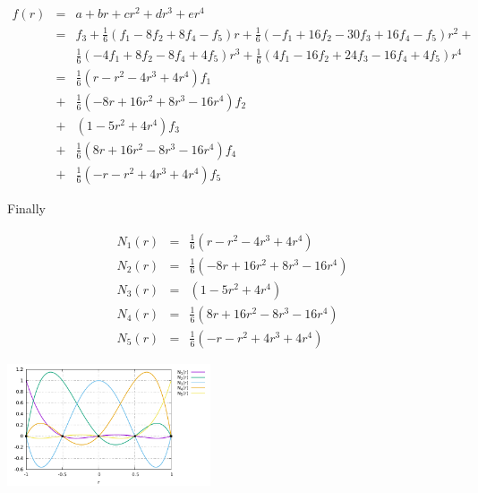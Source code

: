 \begin{eqnarray}
f(r) 
&=& a+br+cr^2+dr^3+er^4 \\
&=& f_3 + 
\frac{1}{6} \left( f_1 -8f_2 +8 f_4 -f_5     \right)  r  +
\frac{1}{6} \left( -f_1 +16f_2 -30f_3    + 16f_4- f_5   \right) r^2 +\\ &&
\frac{1}{6} \left( -4f_1 +8f_2     -8f_4+ 4 f_5   \right) r^3 +
\frac{1}{6} \left( 4f_1 -16f_2 +24f_3 -16f_4+ 4 f_5   \right) r^4 \\
&=& \frac{1}{6} \left(  r- r^2 -4r^3 +4r^4\right) f_1 \\
&+& \frac{1}{6} \left(  -8r+16 r^2 +8r^3 -16 r^4\right) f_2 \\
&+& \left( 1 -5r^2+4r^4  \right) f_3 \\
&+& \frac{1}{6} \left(  8r+16 r^2 -8r^3 -16 r^4\right) f_4 \\
&+& \frac{1}{6} \left(  -r- r^2 +4r^3 +4r^4\right) f_5
\end{eqnarray}

Finally
\begin{mdframed}[backgroundcolor=blue!5]
\begin{eqnarray}
N_1(r)&=& \frac{1}{6} \left(  r- r^2 -4r^3 +4r^4\right) \\
N_2(r)&=& \frac{1}{6} \left(  -8r+16 r^2 +8r^3 -16 r^4\right)  \\
N_3(r)&=& \left( 1 -5r^2+4r^4  \right)  \\
N_4(r)&=& \frac{1}{6} \left(  8r+16 r^2 -8r^3 -16 r^4\right)  \\
N_5(r)&=& \frac{1}{6} \left(  -r- r^2 +4r^3 +4r^4\right) 
\end{eqnarray}
\end{mdframed}


\begin{center}
\includegraphics[width=6cm]{images/basis1D/quartic.pdf}
\end{center}




